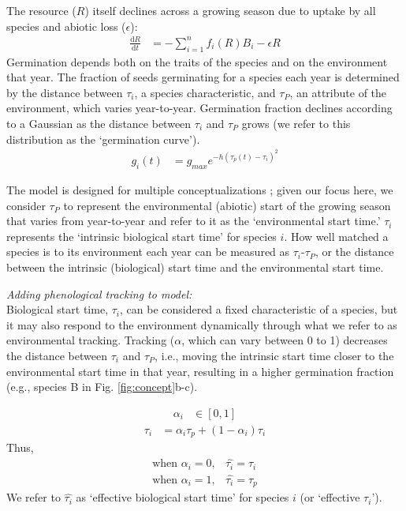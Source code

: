 \documentclass[11pt,letterpaper]{article}
\begin{document}
The resource ($R$) itself declines across a growing season due to uptake by all species and abiotic loss ($\epsilon$):
\begin{align}
\frac{\mathrm{d}R}{\mathrm{d}t} & = - \sum_{i=1}^{n}f_{i}(R)B_{i} -\epsilon R
\end{align}
Germination depends both on the traits of the species and on the environment that year. The fraction of seeds germinating for a species each year is determined by the distance between $\tau_i$, a species characteristic, and $\tau_P$, an attribute of the environment, which varies year-to-year.  Germination fraction declines according to a Gaussian as the distance between $\tau_i$ and $\tau_P$ grows (we refer to this distribution as the `germination curve').  
\begin{align}
g_{i}(t) & = g_{max}e^{-h(\tau_{p}(t)-\tau_{i})^2} 
\end{align}

The model is designed for multiple conceptualizations \citep{Chesson:2004eo}; given our focus here, we consider $\tau_P$ to represent the environmental (abiotic) start of the growing season that varies from year-to-year and refer to it as the `environmental start time.'  $\tau_i$ represents the `intrinsic biological start time' for species $i$. How well matched a species is to its environment each year can be measured as $\tau_i$-$\tau_P$, or the distance between the intrinsic (biological) start time and the environmental start time. 

\noindent \emph{Adding phenological tracking to model:}\\
Biological start time, $\tau_i$, can be considered a fixed characteristic of a species, but it may also respond to the environment dynamically through what we refer to as environmental tracking. Tracking ($\alpha$, which can vary between 0 to 1) decreases the distance between $\tau_i$ and $\tau_P$, i.e., moving the intrinsic start time closer to the environmental start time in that year, resulting in a higher germination fraction (e.g., species B in Fig. \ref{fig:concept}b-c).

\begin{align*}
\alpha_{i} & \in [0, 1]  
\end{align*}
\begin{align}
\hat{\tau_{i}} & = \alpha_{i} \tau_{p} + (1-\alpha_{i})\tau_{i}
\end{align}
\noindent Thus, 
\begin{align*}
\text{when } \alpha_{i} = 0, & \hat{\tau_{i}}=\tau_{i}\\
\text{when }  \alpha_{i} = 1, & \hat{\tau_{i}}=\tau_{p}
\end{align*}
We refer to $\hat{\tau_{i}}$ as `effective biological start time' for species $i$ (or `effective $\tau_i$'). 
\end{document}
